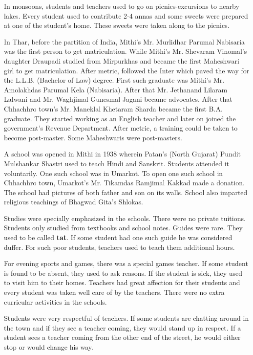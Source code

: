 In monsoons, students and teachers used to go on picnics-excursions to nearby
lakes. Every student used to contribute 2-4 annas and some sweets were prepared
at one of the student's home. These sweets were taken along to the picnics.

In Thar, before the partition of India, Mithi's Mr. Murlidhar Parumal Nabisaria
was the first person to get matriculation. While Mithi's Mr. Shevaram Vinomal's
daughter Draupadi studied from Mirpurkhas and became the first Maheshwari girl
to get matriculation. After metric, followed the Inter which paved the way for
the L.L.B. (Bachelor of Law) degree. First such graduate was Mithi's Mr.
Amolakhdas Parumal Kela (Nabisaria). After that Mr. Jethanand Lilaram Lalwani
and Mr. Waghjimal Gunesmal Jagani became advocates. After that Chhachhro town's
Mr. Maneklal Khetaram Sharda became the first B.A. graduate. They started
working as an English teacher and later on joined the government's Revenue
Department. After metric, a training could be taken to become post-master. Some
Maheshwaris were post-masters.

A school was opened in Mithi in 1938 wherein Patan's (North Gujarat) Pundit
Mulshankar Shastri used to teach Hindi and Sanskrit. Students attended it
voluntarily. One such school was in Umarkot. To open one such school in
Chhachhro town, Umarkot's Mr. Tikamdas Ramjimal Kakkad made a donation. The
school had pictures of both father and son on its walls. School also imparted
religious teachings of Bhagwad Gita's Shlokas.

Studies were specially emphasized in the schools. There were no private tuitions.
Students only studied from textbooks and school notes. Guides were rare. They
used to be called \textbf{tat}. If some student had one such guide he was
considered duffer. For such poor students, teachers used to teach them
additional hours.

For evening sports and games, there was a special games teacher. If some student
is found to be absent, they used  to ask reasons. If the student is sick, they
used to visit him to their homes. Teachers had great affection for their
students and every student was taken well care of by the teachers. There were no
extra curricular activities in the schools.

Students were very respectful of teachers. If some students are chatting around
in the town and if they see a teacher coming, they would stand up in respect. If
a student sees a teacher coming from the other end of the street, he would either
stop or would change his way.

